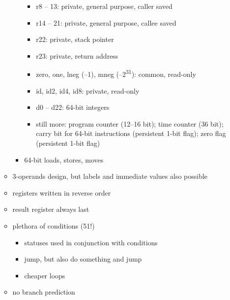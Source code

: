 \begin{itemize}
\begin{itemize}
\begin{itemize}
\begin{itemize}
				\item
				r8 -- 13:
				private,
				general purpose,
				caller saved

				\item
				r14 -- 21:
				private,
				general purpose,
				callee saved

				\item
				r22:
				private,
				stack pointer

				\item
				r23:
				private,
				return address

				\item
				zero, one, lneg (--1), mneg (--2\textsuperscript{31}):
				common,
				read-only

				\item
				id, id2, id4, id8:
				private,
				read-only

				\item
				d0 -- d22:
				64-bit integers

				\item
				still more:
				program counter (12--16 bit);
				time counter (36 bit);
				carry bit for 64-bit instructions (persistent 1-bit flag);
				zero flag (persistent 1-bit flag)
			\end{itemize}

			\item
			64-bit loads, stores, moves
		\end{itemize}

		\item
		3-operands design, but labels and immediate values also possible

		\item
		registers written in reverse order

		\item
		result register always last

		\item
		plethora of conditions (51!)
		\begin{itemize}
			\item
			statuses used in conjunction with conditions

			\item
			jump, but also do something and jump

			\item
			cheaper loops
		\end{itemize}

		\item
		no branch prediction


\end{itemize}
\end{itemize}
